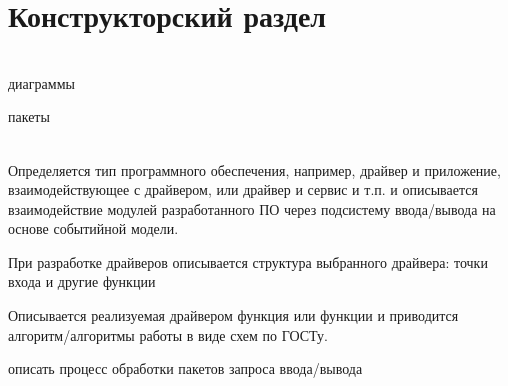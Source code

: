 \chapter{Конструкторский раздел}

\HRule \\
диаграммы

пакеты

\HRule \\
Определяется тип программного обеспечения, например, драйвер и приложение, взаимодействующее с драйвером, или драйвер и сервис и т.п. и описывается взаимодействие модулей разработанного ПО через подсистему ввода/вывода на основе  событийной модели.

При разработке драйверов описывается структура выбранного драйвера: точки входа и другие функции

Описывается реализуемая драйвером функция или функции и приводится  алгоритм/алгоритмы   работы в  виде схем по ГОСТу.

описать процесс обработки пакетов запроса ввода/вывода

